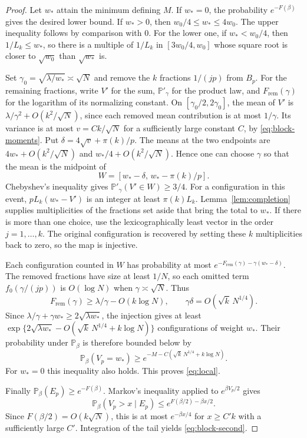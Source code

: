 \documentclass[11pt]{amsart}
\theoremstyle{remark}
\newcommand{\Pp}{\mathbb P}
\begin{document}
\begin{proof}
Let \(w_*\) attain the minimum defining \(M\). If \(w_*=0\), the probability \(e^{-F(\beta)}\) gives the desired lower bound. If \(w_*>0\), then \(w_0/4\le w_*\le4w_0\). The upper inequality follows by comparison with \(0\). For the lower one, if \(w_*<w_0/4\), then \(1/L_k\le w_*\), so there is a multiple of \(1/L_k\) in \([3w_0/4,w_0]\) whose square root is closer to \(\sqrt{w_0}\) than \(\sqrt{w_*}\) is.

Set \(\gamma_0=\sqrt{\lambda/w_*}\asymp\sqrt N\) and remove the \(k\) fractions \(1/(jp)\) from \(B_p\). For the remaining fractions, write \(V'\) for the sum, \(\Pp'_\gamma\) for the product law, and \(F_{\mathrm{rem}}(\gamma)\) for the logarithm of its normalizing constant. On \([\gamma_0/2,2\gamma_0]\), the mean of \(V'\) is
\(\lambda/\gamma^2+O(k^2/\sqrt N)\), since each removed mean contribution is at most \(1/\gamma\). Its variance is at most \(v=C k/\sqrt N\) for a sufficiently large constant \(C\), by \eqref{eq:block-moments}. Put
\(\delta=4\sqrt v+\pi(k)/p\). The means at the two endpoints are \(4w_*+O(k^2/\sqrt N)\) and \(w_*/4+O(k^2/\sqrt N)\). Hence one can choose \(\gamma\) so that the mean is the midpoint of
\[
 W=[w_*-\delta,\,w_*-\pi(k)/p].
\]
Chebyshev's inequality gives \(\Pp'_\gamma(V'\in W)\ge3/4\). For a configuration in this event, \(pL_k(w_*-V')\) is an integer at least \(\pi(k)L_k\). Lemma~\ref{lem:completion} supplies multiplicities of the fractions
set aside that bring the total to \(w_*\). If there is more than one
choice, use the lexicographically least vector in the order \(j=1,\ldots,k\).
The original configuration is recovered by setting these \(k\)
multiplicities back to zero, so the map is injective.

Each configuration counted in \(W\) has probability at most \(e^{-F_{\mathrm{rem}}(\gamma)-\gamma(w_*-\delta)}\). The removed fractions have size at least \(1/N\), so each omitted term \(f_0(\gamma/(jp))\) is \(O(\log N)\) when \(\gamma\asymp\sqrt N\). Thus
\[
 F_{\mathrm{rem}}(\gamma)\ge\lambda/\gamma-O(k\log N),\qquad
 \gamma\delta=O(\sqrt{k}\,N^{1/4}).
\]
Since \(\lambda/\gamma+\gamma w_*\ge2\sqrt{\lambda w_*}\), the injection gives at least \(\exp\{2\sqrt{\lambda w_*}-O(\sqrt k\,N^{1/4}+k\log N)\}\) configurations of weight \(w_*\). Their probability under \(\Pp_\beta\) is therefore bounded below by
\begin{equation}
 \Pp_\beta(V_p=w_*)\ge e^{-M-C(\sqrt k\,N^{1/4}+k\log N)} .
 \label{eq:winning-block-lower}
\end{equation}
For \(w_*=0\) this inequality also holds. This proves \eqref{eq:local}.

Finally \(\Pp_\beta(E_p)\ge e^{-F(\beta)}\). Markov's inequality
applied to \(e^{\beta V_p/2}\) gives
\[
 \Pp_\beta(V_p>x\mid E_p)\le e^{F(\beta/2)-\beta x/2}.
\]
Since \(F(\beta/2)=O(k\sqrt N)\), this is at most \(e^{-\beta x/4}\) for \(x\ge C'k\) with a sufficiently large \(C'\). Integration of the tail yields \eqref{eq:block-second}.
\end{proof}
\end{document}
